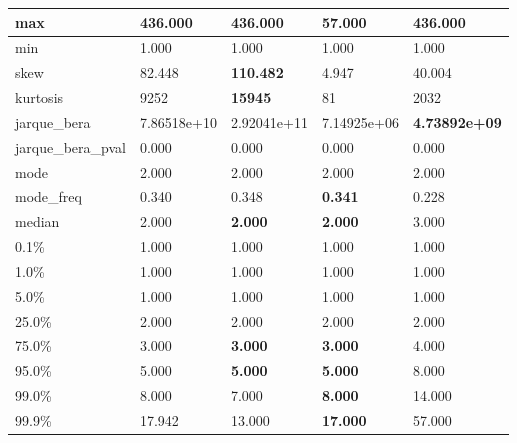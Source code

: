 \begin{table}[H]
\begin{tabular}{|l|m{10em}|m{10em}|m{10em}|m{10em}|}
\hline max & 436.000 & \bfseries 436.000 & \cellcolor[rgb]{0.9, 0.54, 0.52} 57.000 & \bfseries 436.000 \\
\hline min & 1.000 & 1.000 & 1.000 & 1.000 \\
\hline skew & 82.448 & \bfseries 110.482 & \cellcolor[rgb]{0.9, 0.54, 0.52} 4.947 & 40.004 \\
\hline kurtosis & 9252 & \bfseries 15945 & \cellcolor[rgb]{0.9, 0.54, 0.52} 81 & 2032 \\
\hline jarque\_bera & 7.86518e+10 & \cellcolor[rgb]{0.9, 0.54, 0.52} 2.92041e+11 & 7.14925e+06 & \bfseries 4.73892e+09 \\
\hline jarque\_bera\_pval & 0.000 & 0.000 & 0.000 & 0.000 \\
\hline mode & 2.000 & 2.000 & 2.000 & 2.000 \\
\hline mode\_freq & 0.340 & 0.348 & \bfseries 0.341 & \cellcolor[rgb]{0.9, 0.54, 0.52} 0.228 \\
\hline median & 2.000 & \bfseries 2.000 & \bfseries 2.000 & \cellcolor[rgb]{0.9, 0.54, 0.52} 3.000 \\
\hline 0.1\% & 1.000 & 1.000 & 1.000 & 1.000 \\
\hline 1.0\% & 1.000 & 1.000 & 1.000 & 1.000 \\
\hline 5.0\% & 1.000 & 1.000 & 1.000 & 1.000 \\
\hline 25.0\% & 2.000 & 2.000 & 2.000 & 2.000 \\
\hline 75.0\% & 3.000 & \bfseries 3.000 & \bfseries 3.000 & \cellcolor[rgb]{0.9, 0.54, 0.52} 4.000 \\
\hline 95.0\% & 5.000 & \bfseries 5.000 & \bfseries 5.000 & \cellcolor[rgb]{0.9, 0.54, 0.52} 8.000 \\
\hline 99.0\% & 8.000 & 7.000 & \bfseries 8.000 & \cellcolor[rgb]{0.9, 0.54, 0.52} 14.000 \\
\hline 99.9\% & 17.942 & 13.000 & \bfseries 17.000 & \cellcolor[rgb]{0.9, 0.54, 0.52} 57.000 \\
\hline
\end{tabular}
\end{table}
